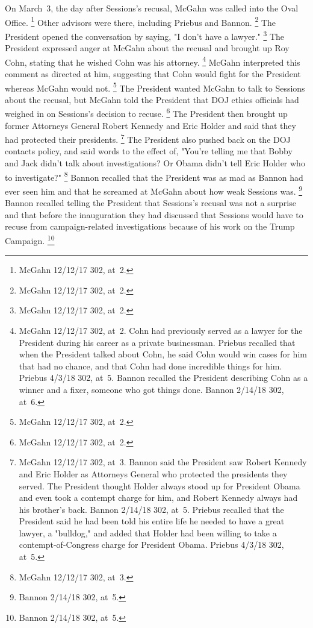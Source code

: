 On March~3, the day after Sessions's recusal, McGahn was called into the Oval Office.%
\footnote{McGahn 12/12/17 302, at~2.}
Other advisors were there, including Priebus and Bannon.%
\footnote{McGahn 12/12/17 302, at~2.}
The President opened the conversation by saying, "I don't have a lawyer."%
\footnote{McGahn 12/12/17 302, at~2.}
The President expressed anger at McGahn about the recusal and brought up Roy Cohn, stating that he wished Cohn was his attorney.%
\footnote{McGahn 12/12/17 302, at~2.
Cohn had previously served as a lawyer for the President during his career as a private businessman.
Priebus recalled that when the President talked about Cohn, he said Cohn would win cases for him that had no chance, and that Cohn had done incredible things for him.
Priebus 4/3/18 302, at~5.
Bannon recalled the President describing Cohn as a winner and a fixer, someone who got things done.
Bannon 2/14/18 302, at~6.}
McGahn interpreted this comment as directed at him, suggesting that Cohn would fight for the President whereas McGahn would not.%
\footnote{McGahn 12/12/17 302, at~2.}
The President wanted McGahn to talk to Sessions about the recusal, but McGahn told the President that DOJ ethics officials had weighed in on Sessions's decision to recuse.%
\footnote{McGahn 12/12/17 302, at~2.}
The President then brought up former Attorneys General Robert Kennedy and Eric Holder and said that they had protected their presidents.%
\footnote{McGahn 12/12/17 302, at~3.
Bannon said the President saw Robert Kennedy and Eric Holder as Attorneys General who protected the presidents they served.
The President thought Holder always stood up for President Obama and even took a contempt charge for him, and Robert Kennedy always had his brother's back.
Bannon 2/14/18 302, at~5.
Priebus recalled that the President said he had been told his entire life he needed to have a great lawyer, a "bulldog," and added that Holder had been willing to take a contempt-of-Congress charge for President Obama.
Priebus 4/3/18 302, at~5.}
The President also pushed back on the DOJ contacts policy, and said words to the effect of, "You're telling me that Bobby and Jack didn't talk about investigations?
Or Obama didn't tell Eric Holder who to investigate?"%
\footnote{McGahn 12/12/17 302, at~3.}
Bannon recalled that the President was as mad as Bannon had ever seen him and that he screamed at McGahn about how weak Sessions was.%
\footnote{Bannon 2/14/18 302, at~5.}
Bannon recalled telling the President that Sessions's recusal was not a surprise and that before the inauguration they had discussed that Sessions would have to recuse from campaign-related investigations because of his work on the Trump Campaign.%
\footnote{Bannon 2/14/18 302, at~5.}

